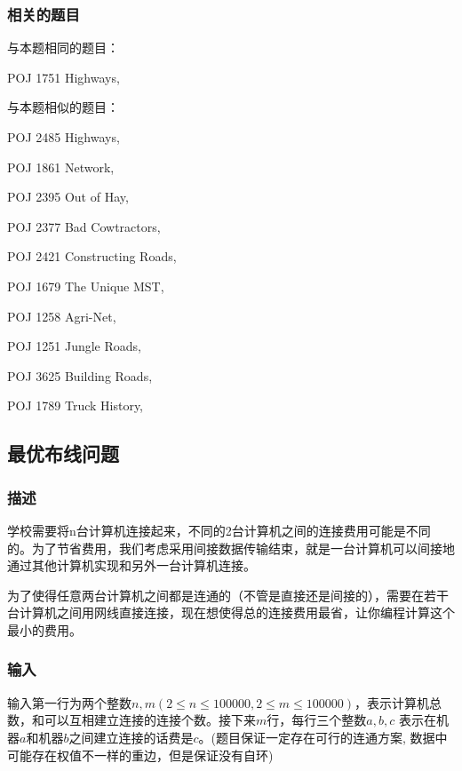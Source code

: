 \subsubsection{相关的题目}
与本题相同的题目：
\begindot
\item POJ 1751 Highways, 
\myenddot

与本题相似的题目：
\begindot
\item POJ 2485 Highways, 
\item POJ 1861 Network, 
\item POJ 2395 Out of Hay, 
\item POJ 2377 Bad Cowtractors, 
\item POJ 2421 Constructing Roads, 
\item POJ 1679 The Unique MST, 
\item POJ 1258 Agri-Net, 
\item POJ 1251 Jungle Roads, 
\item POJ 3625 Building Roads, 
\item POJ 1789 Truck History, 
\myenddot


\subsection{最优布线问题 }
\subsubsection{描述}
学校需要将n台计算机连接起来，不同的2台计算机之间的连接费用可能是不同的。为了节省费用，我们考虑采用间接数据传输结束，就是一台计算机可以间接地通过其他计算机实现和另外一台计算机连接。

为了使得任意两台计算机之间都是连通的（不管是直接还是间接的），需要在若干台计算机之间用网线直接连接，现在想使得总的连接费用最省，让你编程计算这个最小的费用。

\subsubsection{输入}
输入第一行为两个整数$n,m(2 \leq n \leq 100000,2\leq m \leq 100000)$，表示计算机总数，和可以互相建立连接的连接个数。接下来$m$行，每行三个整数$a,b,c$ 表示在机器$a$和机器$b$之间建立连接的话费是$c$。(题目保证一定存在可行的连通方案, 数据中可能存在权值不一样的重边，但是保证没有自环)

